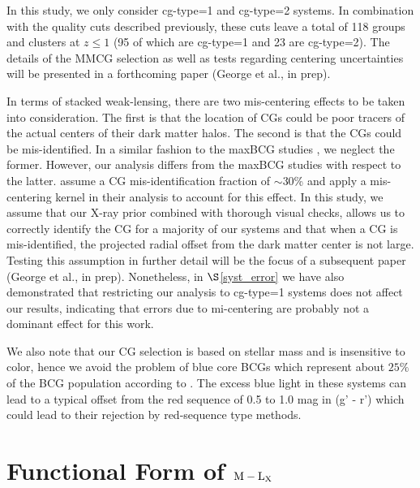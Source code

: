 \documentclass[12pt]{emulateapj}
\newcommand{\qgroup}{118 }      %
\begin{document}
In this study, we only consider {\sc cg-type}=1 and {\sc cg-type}=2
systems. In combination with the quality cuts described previously,
these cuts leave a total of \qgroup groups and clusters at $z \leq 1$
(95 of which are {\sc cg-type}=1 and 23 are {\sc cg-type}=2). The
details of the MMCG selection as well as tests regarding centering
uncertainties will be presented in a forthcoming paper (George et al.,
in prep).

In terms of stacked weak-lensing, there are two mis-centering effects
to be taken into consideration. The first is that the location of CGs
could be poor tracers of the actual centers of their dark matter
halos. The second is that the CGs could be mis-identified. In a
similar fashion to the maxBCG studies
\citep[][]{Sheldon:2007,Johnston:2007}, we neglect the
former. However, our analysis differs from the maxBCG studies with
respect to the latter. \citet{Johnston:2007} assume a CG
mis-identification fraction of $\sim$30\% and apply a mis-centering
kernel in their analysis to account for this effect. In this study, we
assume that our X-ray prior combined with thorough visual checks,
allows us to correctly identify the CG for a majority of our systems
and that when a CG is mis-identified, the projected radial offset from
the dark matter center is not large. Testing this assumption in
further detail will be the focus of a subsequent paper (George et al.,
in prep). Nonetheless, in $\S$\ref{syst_error} we have also
demonstrated that restricting our analysis to {\sc cg-type}=1 systems
does not affect our results, indicating that errors due to
mi-centering are probably not a dominant effect for this work.

We also note that our CG selection is based on stellar mass and is
insensitive to color, hence we avoid the problem of blue core BCGs
which represent about $25\%$ of the BCG population according to
\citet{Bildfell:2008}. The excess blue light in these systems can lead
to a typical offset from the red sequence of 0.5 to 1.0 mag in (g' -
r') which could lead to their rejection by red-sequence type methods.


\section{Functional Form of $\mathrm{M}-\mathrm{L}_{\rm X}$}\label{lx_m_relation}
\end{document}
